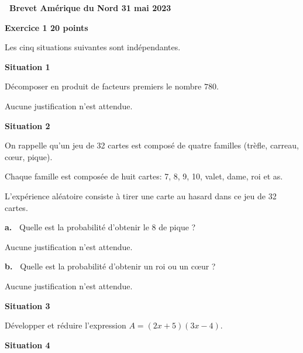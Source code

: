 \documentclass[11pt]{article}
\begin{document}
\setlength\parindent{0mm}
\pagestyle{fancy}
\thispagestyle{empty}
\begin{center} {\huge \textbf{\decofourleft~Brevet Amérique du Nord 31 mai 2023 \decofourright}}
\end{center}

\bigskip

\textbf{Exercice 1 \hfill 20 points}

\medskip

Les cinq situations suivantes sont indépendantes.

\medskip

\textbf{Situation 1}

\medskip

Décomposer en produit de facteurs premiers le nombre $780$. 

Aucune justification n'est attendue.

\medskip

\textbf{Situation 2}

\medskip

On rappelle qu'un jeu de 32 cartes est composé de quatre familles (trèfle, carreau, cœur, pique).

Chaque famille est composée de huit cartes: 7, 8, 9, 10, valet, dame, roi et as.

L'expérience aléatoire consiste à tirer une carte au hasard dans ce jeu de 32 cartes.

\medskip

\textbf{a.~} Quelle est la probabilité d'obtenir le 8 de pique ? 

Aucune justification n'est attendue.

\textbf{b.~} Quelle est la probabilité d'obtenir un roi ou un cœur ? 

Aucune justification n'est attendue.

\medskip

\textbf{Situation 3}

\medskip

Développer et réduire l'expression  $A = (2x + 5)(3x - 4)$.

\medskip

\textbf{Situation 4}

\medskip
\end{document}
